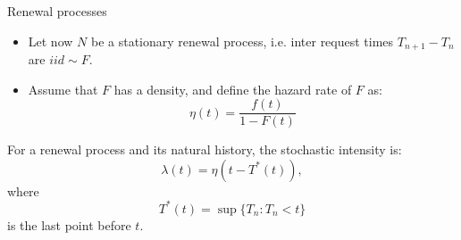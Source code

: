 \documentclass[aspectratio=169]{beamer}
\begin{document}
\begin{frame}{Renewal processes}

	\begin{itemize}
	\item Let now $N$ be a \alert{stationary renewal process}, i.e. inter request times $T_{n+1}-T_n$ are $iid\sim F$.
	
	\item Assume that $F$ has a density, and define the \alert{hazard rate} of $F$ as:
	 \begin{equation*}
		\eta(t) = \frac{f(t)}{1-F(t)}
	 \end{equation*}

	\end{itemize}
	\pause
	 \begin{theorem}
		For a renewal process and its natural history, the stochastic intensity is:
		\begin{equation*}
			\lambda(t) = \eta(t-T^*(t)),
		\end{equation*}
		where 
		\begin{equation*}
			T^*(t) = \sup\{T_n:T_n<t\}
		\end{equation*}
		is the last point before $t$.
	\end{theorem}

\end{frame}
\end{document}
